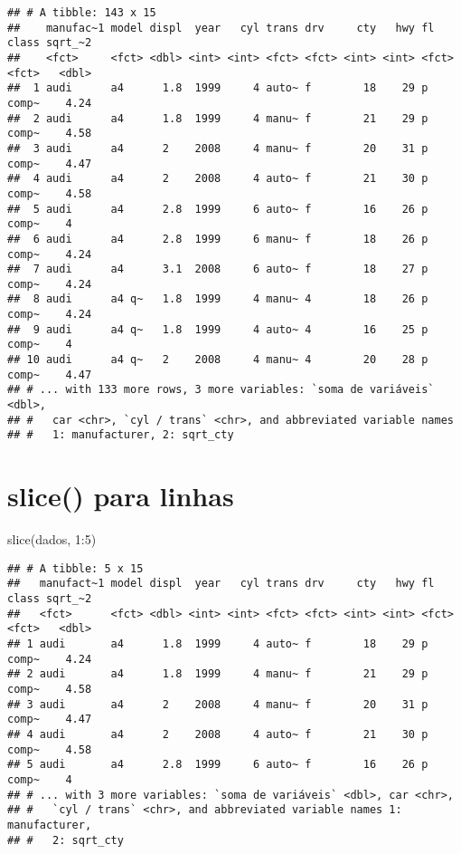 \documentclass[
]{book}
\newenvironment{Shaded}{\begin{snugshade}}{\end{snugshade}}
\newcommand{\DecValTok}[1]{\textcolor[rgb]{0.00,0.00,0.81}{#1}}
\newcommand{\FunctionTok}[1]{\textcolor[rgb]{0.00,0.00,0.00}{#1}}
\newcommand{\NormalTok}[1]{#1}
\newcommand{\SpecialCharTok}[1]{\textcolor[rgb]{0.00,0.00,0.00}{#1}}
\begin{document}
\begin{verbatim}
## # A tibble: 143 x 15
##    manufac~1 model displ  year   cyl trans drv     cty   hwy fl    class sqrt_~2
##    <fct>     <fct> <dbl> <int> <int> <fct> <fct> <int> <int> <fct> <fct>   <dbl>
##  1 audi      a4      1.8  1999     4 auto~ f        18    29 p     comp~    4.24
##  2 audi      a4      1.8  1999     4 manu~ f        21    29 p     comp~    4.58
##  3 audi      a4      2    2008     4 manu~ f        20    31 p     comp~    4.47
##  4 audi      a4      2    2008     4 auto~ f        21    30 p     comp~    4.58
##  5 audi      a4      2.8  1999     6 auto~ f        16    26 p     comp~    4   
##  6 audi      a4      2.8  1999     6 manu~ f        18    26 p     comp~    4.24
##  7 audi      a4      3.1  2008     6 auto~ f        18    27 p     comp~    4.24
##  8 audi      a4 q~   1.8  1999     4 manu~ 4        18    26 p     comp~    4.24
##  9 audi      a4 q~   1.8  1999     4 auto~ 4        16    25 p     comp~    4   
## 10 audi      a4 q~   2    2008     4 manu~ 4        20    28 p     comp~    4.47
## # ... with 133 more rows, 3 more variables: `soma de variáveis` <dbl>,
## #   car <chr>, `cyl / trans` <chr>, and abbreviated variable names
## #   1: manufacturer, 2: sqrt_cty
\end{verbatim}

\hypertarget{slice-para-linhas}{%
\section{slice() para linhas}\label{slice-para-linhas}}

\begin{Shaded}
\begin{Highlighting}[]
\FunctionTok{slice}\NormalTok{(dados, }\DecValTok{1}\SpecialCharTok{:}\DecValTok{5}\NormalTok{)}
\end{Highlighting}
\end{Shaded}

\begin{verbatim}
## # A tibble: 5 x 15
##   manufact~1 model displ  year   cyl trans drv     cty   hwy fl    class sqrt_~2
##   <fct>      <fct> <dbl> <int> <int> <fct> <fct> <int> <int> <fct> <fct>   <dbl>
## 1 audi       a4      1.8  1999     4 auto~ f        18    29 p     comp~    4.24
## 2 audi       a4      1.8  1999     4 manu~ f        21    29 p     comp~    4.58
## 3 audi       a4      2    2008     4 manu~ f        20    31 p     comp~    4.47
## 4 audi       a4      2    2008     4 auto~ f        21    30 p     comp~    4.58
## 5 audi       a4      2.8  1999     6 auto~ f        16    26 p     comp~    4   
## # ... with 3 more variables: `soma de variáveis` <dbl>, car <chr>,
## #   `cyl / trans` <chr>, and abbreviated variable names 1: manufacturer,
## #   2: sqrt_cty
\end{verbatim}
\end{document}
